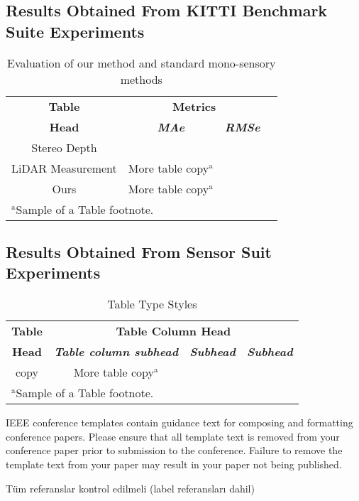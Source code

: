 \documentclass[conference]{IEEEtran}
\begin{document}
\subsection{Results Obtained From KITTI Benchmark Suite Experiments}

\begin{table}[htbp]
    \caption{Evaluation of our method and standard mono-sensory methods}
    \begin{center}
        \begin{tabular}{|c|c|c|}
            \hline
            \textbf{Table}&\multicolumn{2}{|c|}{\textbf{Metrics}} \\
            \cline{2-3} 
            \textbf{Head} & \textbf{\textit{MAe}}& \textbf{\textit{RMSe}} \\
            \hline
            Stereo Depth& &   \\
            \hline
            LiDAR Measurement& More table copy$^{\mathrm{a}}$& \\
            \hline
            Ours& More table copy$^{\mathrm{a}}$& \\
            \hline
            \multicolumn{4}{l}{$^{\mathrm{a}}$Sample of a Table footnote.}
        \end{tabular}
        \label{tab1}
    \end{center}
\end{table}

\subsection{Results Obtained From Sensor Suit Experiments}

\begin{table}[htbp]
\caption{Table Type Styles}
\begin{center}
\begin{tabular}{|c|c|c|c|}
\hline
\textbf{Table}&\multicolumn{3}{|c|}{\textbf{Table Column Head}} \\
\cline{2-4} 
\textbf{Head} & \textbf{\textit{Table column subhead}}& \textbf{\textit{Subhead}}& \textbf{\textit{Subhead}} \\
\hline
copy& More table copy$^{\mathrm{a}}$& &  \\
\hline
\multicolumn{4}{l}{$^{\mathrm{a}}$Sample of a Table footnote.}
\end{tabular}
\label{tab1}
\end{center}
\end{table}



\vspace{12pt}
\color{red}
IEEE conference templates contain guidance text for composing and formatting conference papers. Please ensure that all template text is removed from your conference paper prior to submission to the conference. Failure to remove the template text from your paper may result in your paper not being published.

\vspace{12pt}
\color{red}
Tüm referanslar kontrol edilmeli (label referansları dahil)
\end{document}
